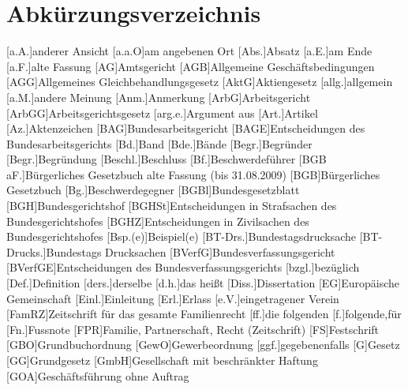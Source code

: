 \chapter{Abkürzungsverzeichnis}
\begin{acronym}[MittRhNotK]
\setlength{\itemsep}{-\parsep} %
[a.A.]{anderer Ansicht}
[a.a.O]{am angebenen Ort}
[Abs.]{Absatz}
[a.E.]{am Ende}
[a.F.]{alte Fassung}
[AG]{Amtsgericht}
[AGB]{Allgemeine Geschäftsbedingungen}
[AGG]{Allgemeines Gleichbehandlungsgesetz}
[AktG]{Aktiengesetz}
[allg.]{allgemein}
[a.M.]{andere Meinung}
[Anm.]{Anmerkung}
[ArbG]{Arbeitsgericht}
[ArbGG]{Arbeitsgerichtsgesetz}
[arg.e.]{Argument aus}
[Art.]{Artikel}
[Az.]{Aktenzeichen}
[BAG]{Bundesarbeitsgericht}
[BAGE]{Entscheidungen des Bundesarbeitsgerichts}
[Bd.]{Band}
[Bde.]{Bände}
[Begr.]{Begründer}
[Begr.]{Begründung}
[Beschl.]{Beschluss}
[Bf.]{Beschwerdeführer}
[BGB aF.]{Bürgerliches Gesetzbuch alte Fassung (bis 31.08.2009)}
[BGB]{Bürgerliches Gesetzbuch}
[Bg.]{Beschwerdegegner}
[BGBl]{Bundesgesetzblatt}
[BGH]{Bundesgerichtshof}
[BGHSt]{Entscheidungen in Strafsachen des Bundesgerichtshofes}
[BGHZ]{Entscheidungen in Zivilsachen des Bundesgerichtshofes}
[Bsp.(e)]{Beispiel(e)}
[BT-Drs.]{Bundestagsdrucksache}
[BT-Drucks.]{Bundestags Drucksachen}
[BVerfG]{Bundesverfassungsgericht}
[BVerfGE]{Entscheidungen des Bundesverfassungsgerichts}
[bzgl.]{bezüglich}
[Def.]{Definition}
[ders.]{derselbe}
[d.h.]{das heißt}
[Diss.]{Dissertation}
[EG]{Europäische Gemeinschaft}
[Einl.]{Einleitung}
[Erl.]{Erlass}
[e.V.]{eingetragener Verein}
[FamRZ]{Zeitschrift für das gesamte Familienrecht}
[ff.]{die folgenden}
[f.]{folgende,für}
[Fn.]{Fussnote}
[FPR]{Familie, Partnerschaft, Recht (Zeitschrift)}
[FS]{Festschrift}
[GBO]{Grundbuchordnung}
[GewO]{Gewerbeordnung}
[ggf.]{gegebenenfalls}
[G]{Gesetz}
[GG]{Grundgesetz}
[GmbH]{Gesellschaft mit beschränkter Haftung}
[GOA]{Geschäftsführung ohne Auftrag}

\end{acronym}
